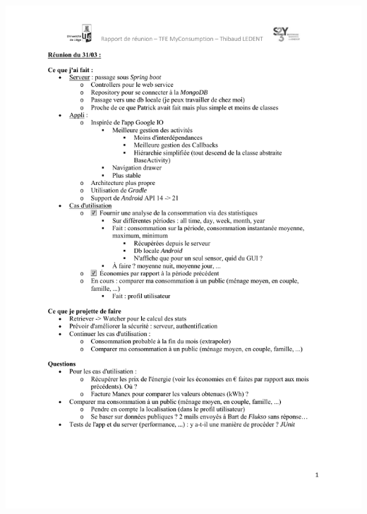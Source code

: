 \documentclass[a4paper, oneside, 11pt]{book}
\begin{document}
\includegraphics[width=1\textwidth]{reports_NB_Part12.pdf}
\newpage
\end{document}
